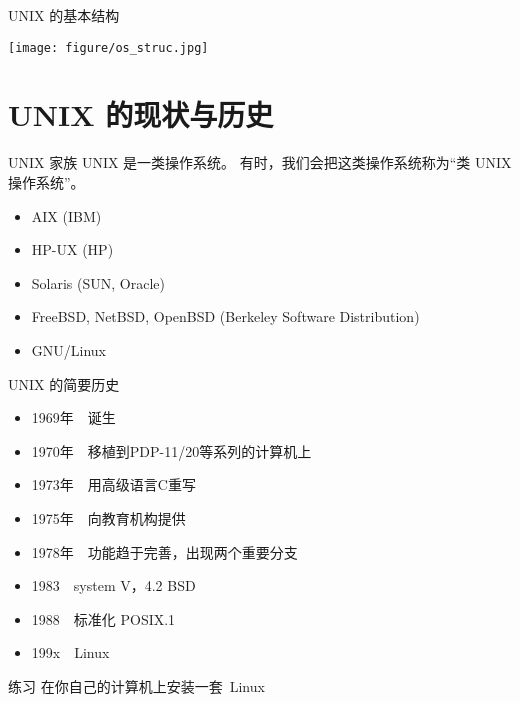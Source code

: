 \begin{frame}{UNIX 的基本结构}
\begin{center}
\texttt{[image: figure/os\_struc.jpg]}
\end{center}
\end{frame}

\section{UNIX 的现状与历史}
\begin{frame}{UNIX 家族}
UNIX 是一类操作系统。
有时，我们会把这类操作系统称为“类 UNIX 操作系统”。

\begin{itemize}
  \item AIX (IBM)
  \item HP-UX (HP)
  \item Solaris (SUN, Oracle)
  \item FreeBSD, NetBSD, OpenBSD (Berkeley Software Distribution)
  \item GNU/Linux 
\end{itemize}
\end{frame}

\begin{frame}{UNIX 的简要历史}
\begin{itemize}
  \item 1969年~~诞生
  \item 1970年~~移植到PDP-11/20等系列的计算机上
  \item 1973年~~用高级语言C重写
  \item 1975年~~向教育机构提供
  \item 1978年~~功能趋于完善，出现两个重要分支
  \item 1983~~system V，4.2 BSD
  \item 1988~~标准化 POSIX.1
  \item 199x~~Linux
\end{itemize}
\end{frame}




\begin{frame}{练习}
在你自己的计算机上安装一套~Linux 
\end{frame}
